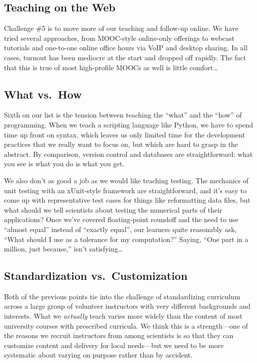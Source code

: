 \documentclass{article}
\begin{document}
\subsection{Teaching on the Web}

Challenge \#5 is to move more of our teaching and follow-up online. We
have tried several approaches, from MOOC-style online-only offerings to
webcast tutorials and one-to-one online office hours via VoIP and
desktop sharing. In all cases, turnout has been mediocre at the start
and dropped off rapidly. The fact that this is true of most high-profile
MOOCs as well is little comfort\ldots{}

\subsection{What vs.~How}

Sixth on our list is the tension between teaching the ``what'' and the
``how'' of programming. When we teach a scripting language like Python,
we have to spend time up front on syntax, which leaves us only limited
time for the development practices that we really want to focus on, but
which are hard to grasp in the abstract. By comparison, version control
and databases are straightforward: what you see is what you do is what
you get.

We also don't as good a job as we would like teaching testing. The
mechanics of unit testing with an xUnit-style framework are
straightforward, and it's easy to come up with representative test cases
for things like reformatting data files, but what should we tell
scientists about testing the numerical parts of their applications? Once
we've covered floating-point roundoff and the need to use ``almost
equal'' instead of ``exactly equal'', our learners quite reasonably ask,
``What should I use as a tolerance for my computation?'' Saying, ``One
part in a million, just because,'' isn't satisfying\ldots{}

\subsection{Standardization vs.~Customization}

Both of the previous points tie into the challenge of standardizing
curriculum across a large group of volunteer instructors with very
different backgrounds and interests. What we \emph{actually} teach
varies more widely than the content of most university courses with
prescribed curricula. We think this is a strength---one of the reasons
we recruit instructors from among scientists is so that they can
customize content and delivery for local needs---but we need to be more
systematic about varying on purpose rather than by accident.
\end{document}
